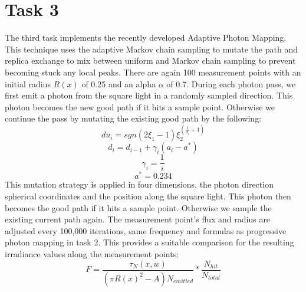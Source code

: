 \section*{Task 3}
The third task implements the recently developed Adaptive Photon Mapping. This technique uses the adaptive Markov chain sampling to mutate the path and replica exchange to mix between uniform and Markov chain sampling to prevent becoming stuck any local peaks. There are again 100 measurement points with an initial radius $ R(x) $ of 0.25 and an alpha $ \alpha $ of 0.7.
During each photon pass, we first emit a photon from the square light in a randomly sampled direction. This photon becomes the new good path if it hits a sample point. Otherwise we continue the pass by mutating the existing good path by the following:
$$du_i = sgn(2\xi_1 - 1)\xi_2^{(\frac{1}{d_i}+1)}$$
$$d_i = d_{i-1} + \gamma_i(a_i - a^*)$$
$$\gamma_i = \frac{1}{i}$$
$$a^* = 0.234$$
This mutation strategy is applied in four dimensions, the photon direction spherical coordinates and the position along the square light. This photon then becomes the good path if it hits a sample point. Otherwise we sample the existing current path again. The measurement point's flux and radius are adjusted every 100,000 iterations, same frequency and formulas as progressive photon mapping in task 2. This provides a suitable comparison for the resulting irradiance values along the measurement points:
$$ F = \frac{\tau_{N}(x, w)}{(\pi R(x)^2 - A) N_{emitted}}*\frac{N_{hit}}{N_{total}} $$
